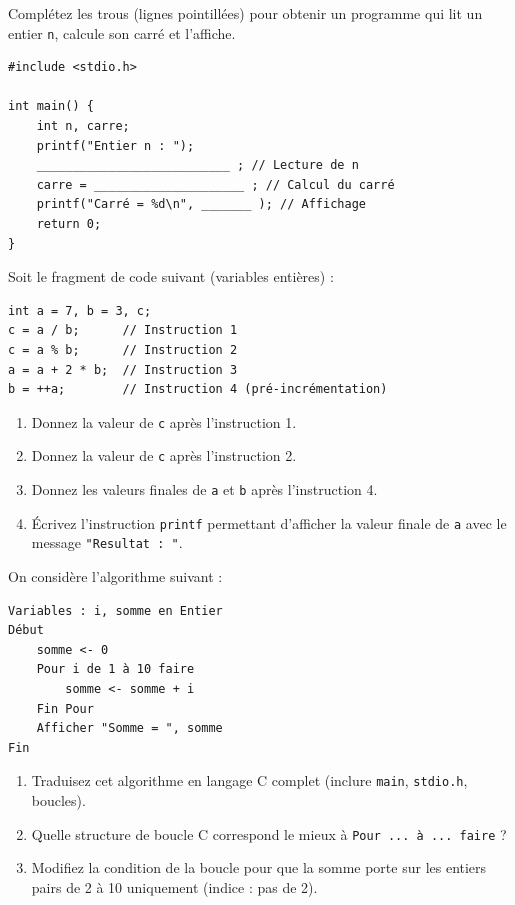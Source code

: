 \documentclass[11pt]{article}
\begin{document}
\begin{exercice}
Complétez les trous (lignes pointillées) pour obtenir un programme qui lit un entier \texttt{n}, calcule son carré et l'affiche.
\begin{verbatim}
#include <stdio.h>

int main() {
    int n, carre;
    printf("Entier n : ");
    ___________________________ ; // Lecture de n
    carre = _____________________ ; // Calcul du carré
    printf("Carré = %d\n", _______ ); // Affichage
    return 0;
}
\end{verbatim}
\end{exercice}

\begin{exercice}
Soit le fragment de code suivant (variables entières) :
\begin{verbatim}
int a = 7, b = 3, c;
c = a / b;      // Instruction 1
c = a % b;      // Instruction 2
a = a + 2 * b;  // Instruction 3
b = ++a;        // Instruction 4 (pré-incrémentation)
\end{verbatim}
\begin{enumerate}
    \item Donnez la valeur de \texttt{c} après l'instruction 1.
    \item Donnez la valeur de \texttt{c} après l'instruction 2.
    \item Donnez les valeurs finales de \texttt{a} et \texttt{b} après l'instruction 4.
    \item Écrivez l'instruction \texttt{printf} permettant d'afficher la valeur finale de \texttt{a} avec le message \texttt{"Resultat : "}.
\end{enumerate}
\end{exercice}

\begin{exercice}
On considère l'algorithme suivant :
\begin{verbatim}
Variables : i, somme en Entier
Début
    somme <- 0
    Pour i de 1 à 10 faire
        somme <- somme + i
    Fin Pour
    Afficher "Somme = ", somme
Fin
\end{verbatim}
\begin{enumerate}
    \item Traduisez cet algorithme en langage C complet (inclure \texttt{main}, \texttt{stdio.h}, boucles).
    \item Quelle structure de boucle C correspond le mieux à \texttt{Pour ... à ... faire} ?
    \item Modifiez la condition de la boucle pour que la somme porte sur les entiers pairs de 2 à 10 uniquement (indice : pas de 2).
\end{enumerate}
\end{exercice}
\end{document}
